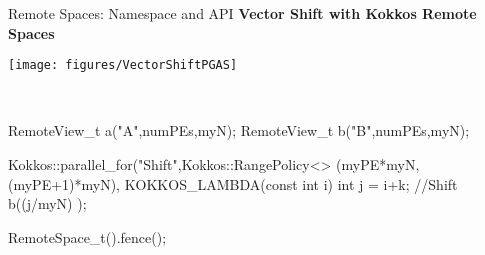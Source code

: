 
\begin{frame}[fragile]{Remote Spaces: Namespace and API}
  \vspace{10pt}
  \textbf{Vector Shift with Kokkos Remote Spaces}
    \vspace{4pt}
  \center
  \begin{center}
  \texttt{[image: figures/VectorShiftPGAS]}
  \end{center}\
  \vspace{10pt}
  \begin{code}[keywords={RemoteSpace_t,RemoteView_t,parallel_for,Kokkos,View,Experimental,deep_copy, RangePolicy, KOKKOS_LAMBDA}]
  RemoteView_t a("A",numPEs,myN);
  RemoteView_t b("B",numPEs,myN);

  Kokkos::parallel_for("Shift",Kokkos::RangePolicy<>
  (myPE*myN,(myPE+1)*myN), KOKKOS_LAMBDA(const int i) { 
    int j = i+k; //Shift
    b((j/myN)%
  });

  RemoteSpace_t().fence(); 
  \end{code}
\end{frame}


